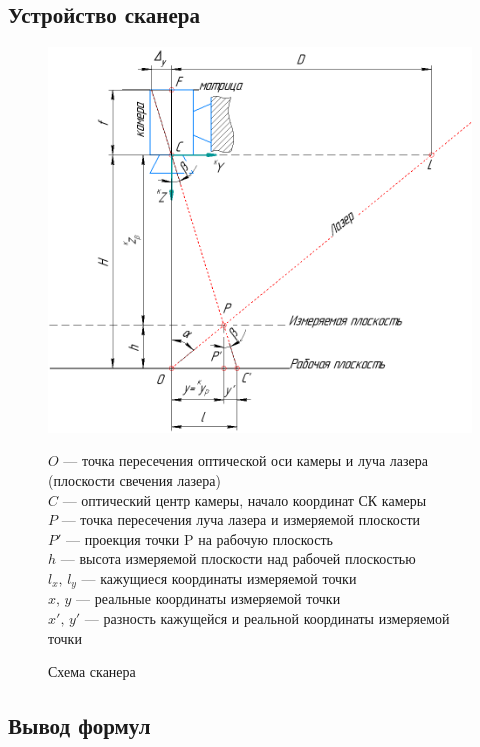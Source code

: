 \documentclass[a4paper, 12pt]{article}
\begin{document}
		\subsection{Устройство сканера}
			\begin{figure}[h!]
				\begin{center}
					\includegraphics[width=0.75\linewidth]{main-scheme.png}
					\caption{Схема сканера}
				\end{center}
				$O$ --- точка пересечения оптической оси камеры и луча лазера (плоскости свечения лазера)\\
				$C$ --- оптический центр камеры, начало координат СК камеры\\
				$P$ --- точка пересечения луча лазера и измеряемой плоскости\\
				$P'$ --- проекция точки P на рабочую плоскость\\
				$h$ --- высота измеряемой плоскости над рабочей плоскостью\\
				$l_x,\,l_y$ --- кажущиеся координаты измеряемой точки\\
				$x,\,y$ --- реальные координаты измеряемой точки\\
				$x',\,y'$ --- разность кажущейся и реальной координаты измеряемой точки\\
			\end{figure}
		\subsection{Вывод формул}\label{sec:вывод_формул}
\end{document}

